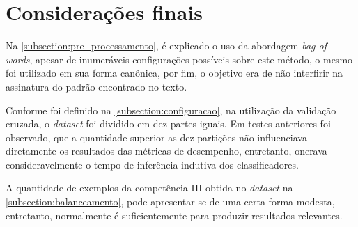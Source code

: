 \section{Considerações finais}

Na \autoref{subsection:pre_processamento}, é explicado o uso da abordagem
\textit{bag-of-words}, apesar de inumeráveis configurações possíveis sobre este 
método, o mesmo foi utilizado em sua forma canônica, por fim, o objetivo era de 
não interfirir na assinatura do padrão encontrado no texto.

Conforme foi definido na \autoref{subsection:configuracao}, na utilização da 
validação cruzada, o \textit{dataset} foi dividido em dez partes iguais. Em 
testes anteriores foi observado, que a quantidade superior as dez partições 
não influenciava diretamente os resultados das métricas de desempenho, 
entretanto, onerava consideravelmente o tempo de inferência indutiva dos 
classificadores.

A quantidade de exemplos da competência III obtida no \textit{dataset} na 
\autoref{subsection:balanceamento}, pode apresentar-se de uma certa forma 
modesta, entretanto, normalmente é suficientemente para produzir resultados 
relevantes.
